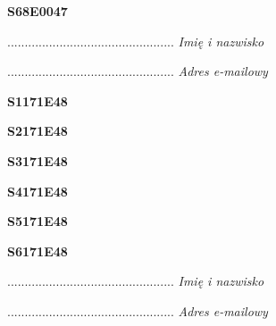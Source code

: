 \begin{turn}{90}\huge \textbf{S68E0047}\end{turn}

\begin{turn}{90}\begin{minipage}{\linewidth} \vspace{20mm} ................................................  \textit{Imię i nazwisko}\end{minipage}\end{turn}

\begin{turn}{90}\begin{minipage}{\linewidth} \vspace{20mm} ................................................  \textit{Adres e-mailowy}\end{minipage}\end{turn}

\begin{turn}{90}\huge \textbf{S1171E48}\end{turn}

\begin{turn}{90}\huge \textbf{S2171E48}\end{turn}

\begin{turn}{90}\huge \textbf{S3171E48}\end{turn}

\begin{turn}{90}\huge \textbf{S4171E48}\end{turn}

\begin{turn}{90}\huge \textbf{S5171E48}\end{turn}

\begin{turn}{90}\huge \textbf{S6171E48}\end{turn}

\begin{turn}{90}\begin{minipage}{\linewidth} \vspace{20mm} ................................................  \textit{Imię i nazwisko}\end{minipage}\end{turn}

\begin{turn}{90}\begin{minipage}{\linewidth} \vspace{20mm} ................................................  \textit{Adres e-mailowy}\end{minipage}\end{turn}

